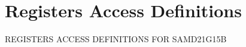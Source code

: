 \hypertarget{group___s_a_m_d21_g15_b__reg}{}\section{Registers Access Definitions}
\label{group___s_a_m_d21_g15_b__reg}
R\+E\+G\+I\+S\+T\+E\+RS A\+C\+C\+E\+SS D\+E\+F\+I\+N\+I\+T\+I\+O\+NS F\+OR S\+A\+M\+D21\+G15B 